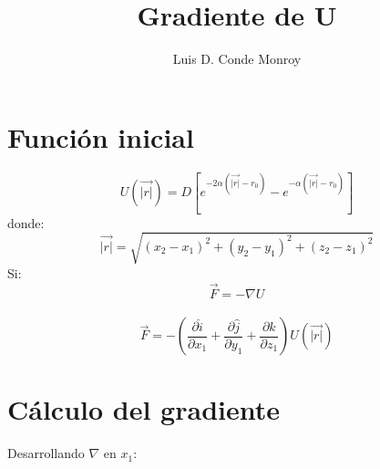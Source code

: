 \documentclass[8pt]{article}
\title{Gradiente de U}
\author{Luis D. Conde Monroy}
\begin{document}
 \maketitle
 
 \section{Función inicial}
 \begin{equation}
  U(\vec{|r|}) = D[e^{-2\alpha(\vec{|r|}-r_0)} - e^{-\alpha(\vec{|r|}-r_0)}]
 \end{equation}
 donde:
 \begin{equation}
  \vec{|r|}= \sqrt{(x_2-x_1)^2 + (y_2-y_1)^2 + (z_2-z_1)^2}
 \end{equation}
Si: 
\\
\begin{equation}
\vec{F}= -\nabla U
\end{equation}
\\ 
\begin{equation}
\vec{F}= -\left(\frac{\partial  \hat{\textit{i}}}{\partial x_1} + \frac{\partial \hat{\textit{j}}}{\partial y_1} + \frac{\partial  \hat{\textit{k}}}{\partial z_1}\right) U(\vec{|r|})
\end{equation}

\section{Cálculo del gradiente} 

Desarrollando $\nabla$ en $x_1$:
\end{document}
